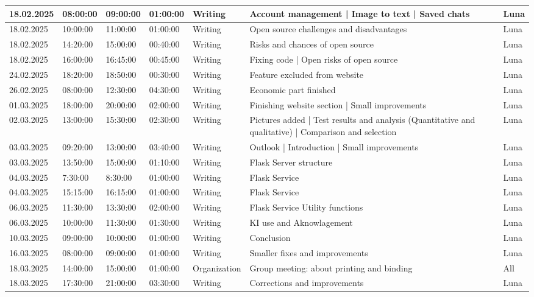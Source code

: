 \begin{longtable}{@{}p{1.8cm} p{1.2cm} p{1.2cm} p{1.2cm} p{2cm} p{4.5cm} p{2cm}@{}}
\hline
18.02.2025 & 08:00:00 & 09:00:00 & 01:00:00 & Writing & Account management | Image to text | Saved chats & Luna \\
\hline
18.02.2025 & 10:00:00 & 11:00:00 & 01:00:00 & Writing & Open source challenges and disadvantages & Luna \\
\hline
18.02.2025 & 14:20:00 & 15:00:00 & 00:40:00 & Writing & Risks and chances of open source & Luna \\
\hline
18.02.2025 & 16:00:00 & 16:45:00 & 00:45:00 & Writing & Fixing code | Open risks of open source & Luna \\
\hline
24.02.2025 & 18:20:00 & 18:50:00 & 00:30:00 & Writing & Feature excluded from website & Luna \\
\hline
26.02.2025 & 08:00:00 & 12:30:00 & 04:30:00 & Writing & Economic part finished & Luna \\
\hline
01.03.2025 & 18:00:00 & 20:00:00 & 02:00:00 & Writing & Finishing website section | Small improvements & Luna \\
\hline
02.03.2025 & 13:00:00 & 15:30:00 & 02:30:00 & Writing & Pictures added | Test results and analysis (Quantitative and qualitative) | Comparison and selection & Luna \\
\hline
03.03.2025 & 09:20:00 & 13:00:00 & 03:40:00 & Writing & Outlook | Introduction | Small improvements & Luna \\
\hline
03.03.2025 & 13:50:00 & 15:00:00 & 01:10:00 & Writing & Flask Server structure & Luna \\
\hline
04.03.2025 & 7:30:00 & 8:30:00 & 01:00:00 & Writing & Flask Service & Luna \\
\hline
04.03.2025 & 15:15:00 & 16:15:00 & 01:00:00 & Writing & Flask Service & Luna \\
\hline
06.03.2025 & 11:30:00 & 13:30:00 & 02:00:00 & Writing & Flask Service Utility functions & Luna \\
\hline
06.03.2025 & 10:00:00 & 11:30:00 & 01:30:00 & Writing & KI use and Aknowlagement & Luna \\
\hline
10.03.2025 & 09:00:00 & 10:00:00 & 01:00:00 & Writing & Conclusion & Luna \\
\hline
16.03.2025 & 08:00:00 & 09:00:00 & 01:00:00 & Writing & Smaller fixes and improvements & Luna \\
\hline
18.03.2025 & 14:00:00 & 15:00:00 & 01:00:00 & Organization & Group meeting: about printing and binding & All \\
\hline
18.03.2025 & 17:30:00 & 21:00:00 & 03:30:00 & Writing & Corrections and improvements & Luna \\

\end{longtable}



